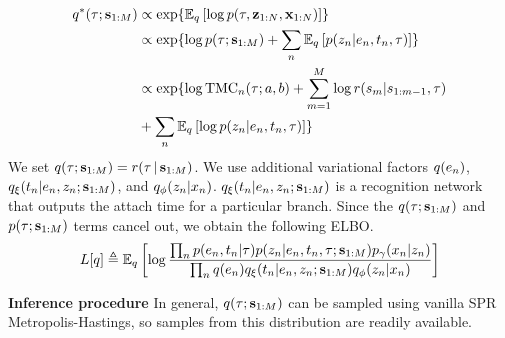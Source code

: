 \begin{equation}
\begin{split}
    q^*(\tree; \inducingpoints) 
    &\propto \exp{\E_\q\left[\log \p(\tree, \latentdataset, \dataset)\right]} \\
    &\propto \exp{\log \p(\tree ; \inducingpoints) + \sum_\n \E_\q\left[\p(\z_\n | e_\n, t_\n, \tree)\right]} \\
    &\propto \exp{\log \mathrm{TMC}_\n(\tree; a, b) + \sum_{m = 1}^M \log r(\inducingpoint_m | \inducingpoint_{1:m - 1}, \tree) \\&+ \sum_\n \E_\q\left[\log \p(\z_\n | e_\n, t_\n, \tree)\right]} \\
\end{split}
\end{equation}
We  set $q(\tau; \mathbf{s}_{1:M}) = r(\tau \,|\, \mathbf{s}_{1:M})$.
We use additional variational factors
$q(e_n)$,
$q_{\xi}(t_n | e_n, z_n; \mathbf{s}_{1:M})$,
and
$q_\phi(z_n | x_n)$.
$q_{\xi}(t_n | e_n, z_n; \mathbf{s}_{1:M})$ is a
recognition network that outputs
the attach time for a particular branch.
Since the $q(\tau; \mathbf{s}_{1:M})$ and $p(\tau; \mathbf{s}_{1:M})$ terms
cancel out, we obtain the following ELBO.
\begin{equation}
    \begin{split}
    L[q] &\triangleq \mathbb{E}_q \left[\log \frac{\prod_n p(e_n, t_n | \tau) p(z_n | e_n, t_n, \tau; \mathbf{s}_{1:M})p_\gamma(x_n | z_n)}{\prod_n q(e_n)q_{\xi}(t_n | e_n, z_n; \mathbf{s}_{1:M})q_\phi(z_n | x_n)}\right] \\
    \end{split}
\end{equation}

\textbf{Inference procedure}
In general, $q(\tau; \mathbf{s}_{1:M})$ can
be sampled using vanilla SPR Metropolis-Hastings,
so samples from this distribution are readily available. 

